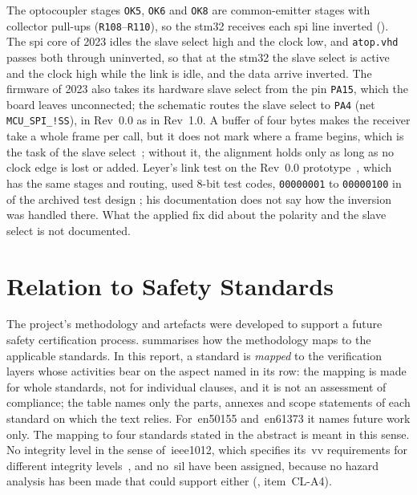 The optocoupler stages \texttt{OK5}, \texttt{OK6} and \texttt{OK8} are common-emitter stages with collector pull-ups (\texttt{R108}--\texttt{R110}), so the \gls{stm32} receives each \gls{spi} line inverted (). The \gls{spi} core of 2023 idles the slave select high and the clock low, and \texttt{atop.vhd} passes both through uninverted, so that at the \gls{stm32} the slave select is active and the clock high while the link is idle, and the data arrive inverted. The firmware of 2023 also takes its hardware slave select from the pin \texttt{PA15}, which the board leaves unconnected; the schematic routes the slave select to \texttt{PA4} (net \texttt{MCU\_SPI\_!SS}), in Rev~0.0 as in Rev~1.0. A buffer of four bytes makes the receiver take a whole frame per call, but it does not mark where a frame begins, which is the task of the slave select~\cite[Sec.~20.3.1]{st_rm0368}; without it, the alignment holds only as long as no clock edge is lost or added. Leyer's link test on the Rev~0.0 prototype~\cite[Sec.~4.11.2]{leyer2023}, which has the same stages and routing, used 8-bit test codes, \texttt{00000001} to \texttt{00000100} in  of the archived test design ; his documentation does not say how the inversion was handled there. What the applied fix did about the polarity and the slave select is not documented.

\section{Relation to Safety Standards}
\label{sec:safety_compliance}

The project's methodology and artefacts were developed to support a future safety certification process.  summarises how the methodology maps to the applicable standards. In this report, a standard is \emph{mapped} to the verification layers whose activities bear on the aspect named in its row: the mapping is made for whole standards, not for individual clauses, and it is not an assessment of compliance; the table names only the parts, annexes and scope statements of each standard on which the text relies. For~\gls{en50155} and~\gls{en61373} it names future work only. The mapping to four standards stated in the abstract is meant in this sense. No integrity level in the sense of~\gls{ieee1012}, which specifies its~\gls{vv} requirements for different integrity levels~\cite{ieee1012_2024}, and no~\gls{sil} have been assigned, because no hazard analysis has been made that could support either (, item~CL-A4).

